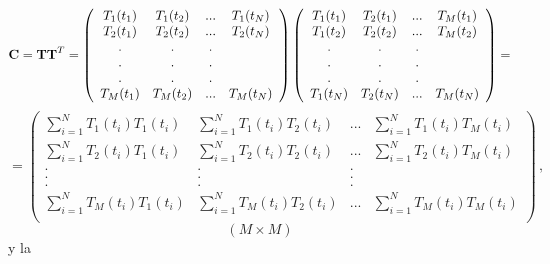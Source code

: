 \documentclass[
]{agujournal2019}
\begin{document}
\[{\textbf C}={\textbf T}{\textbf T}^T=\left(\begin{array}{cccc}
   T_{1}(t_1) & T_{1}(t_2) & ... & T_{1}(t_N)\\
   T_{2}(t_1) & T_{2}(t_2) & ... & T_{2}(t_N)\\
                . & . & . \\
        . & . & . \\
        . & . & . \\
   T_{M}(t_1) & T_{M}(t_2) & ... & T_{M}(t_N)\\
        \end{array}\right)
\left(\begin{array}{cccc}
   T_{1}(t_1) & T_{2}(t_1) & ... & T_{M}(t_1)\\
   T_{1}(t_2) & T_{2}(t_2) & ... & T_{M}(t_2)\\
                . & . & . \\
        . & . & . \\
        . & . & . \\
   T_{1}(t_N) & T_{2}(t_N) & ... & T_{M}(t_N)\\
        \end{array}\right)=\] \[=\left(\begin{array}{cccc}
   \sum\limits_{i=1}^N{T_{1}(t_i)T_{1}(t_i)} & \sum\limits_{i=1}^N{T_{1}(t_i)T_{2}(t_i)} & ... & \sum\limits_{i=1}^N{T_{1}(t_i)T_{M}(t_i)}\\
   \sum\limits_{i=1}^N{T_{2}(t_i)T_{1}(t_i)} & \sum\limits_{i=1}^N{T_{2}(t_i)T_{2}(t_i)} & ... & \sum\limits_{i=1}^N{T_{2}(t_i)T_{M}(t_i)}\\
                . & . & . \\
        . & . & . \\
        . & . & . \\
   \sum\limits_{i=1}^N{T_{M}(t_i)T_{1}(t_i)} & \sum\limits_{i=1}^N{T_{M}(t_i)T_{2}(t_i)} & ... & \sum\limits_{i=1}^N{T_{M}(t_i)T_{M}(t_i)}\\
        \end{array}\right)\,,\] \[\left( M \times M \right)\] y la
\end{document}
